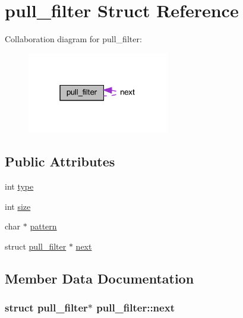 \hypertarget{structpull__filter}{}\section{pull\+\_\+filter Struct Reference}
\label{structpull__filter}


Collaboration diagram for pull\+\_\+filter\+:
\nopagebreak
\begin{figure}[H]
\begin{center}
\leavevmode
\includegraphics[width=175pt]{structpull__filter__coll__graph}
\end{center}
\end{figure}
\subsection*{Public Attributes}
\begin{DoxyCompactItemize}
\item 
int \hyperlink{structpull__filter_a147071222d7c866ca63ee39cb4329c85}{type}
\item 
int \hyperlink{structpull__filter_a39e34fe456f78a37ed09a438cd92403a}{size}
\item 
char $\ast$ \hyperlink{structpull__filter_a57e01ea9f0c86327fac90cb4e5480ba6}{pattern}
\item 
struct \hyperlink{structpull__filter}{pull\+\_\+filter} $\ast$ \hyperlink{structpull__filter_a4bac8f327593c5a73a9116f741f78444}{next}
\end{DoxyCompactItemize}


\subsection{Member Data Documentation}
\hypertarget{structpull__filter_a4bac8f327593c5a73a9116f741f78444}{}
\subsubsection[{next}]{\setlength{\rightskip}{0pt plus 5cm}struct {\bf pull\+\_\+filter}$\ast$ pull\+\_\+filter\+::next}\label{structpull__filter_a4bac8f327593c5a73a9116f741f78444}
\hypertarget{structpull__filter_a57e01ea9f0c86327fac90cb4e5480ba6}{}
